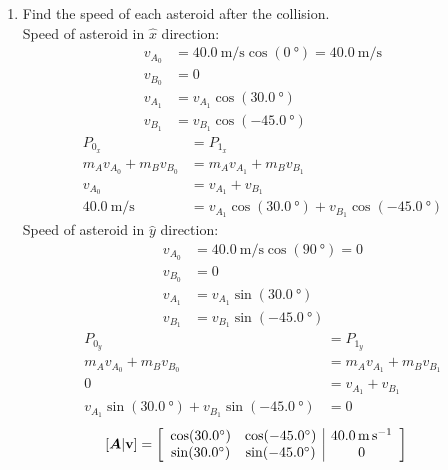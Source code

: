 \documentclass{article}
\begin{document}
\begin{enumerate}[label = \textbf{(\alph*)}]
	\item Find the speed of each asteroid after the collision. \\
		Speed of asteroid in $ \hat{x} $ direction:
		\begin{align*}
			v_{A_0} & = \SI{40.0}{\meter \per \second}\cos(\SI{0}{\degree}) = \SI{40.0}{\meter \per \second} \\
			v_{B_0} & = 0 \\
			v_{A_1} & = v_{A_1}\cos(\SI{30.0}{\degree}) \\
			v_{B_1} & = v_{B_1}\cos(\SI{-45.0}{\degree})
		\end{align*}
		\begin{align*}
			P_{0_x} & = P_{1_x} \\
			m_Av_{A_0} + m_Bv_{B_0} & = m_Av_{A_1} + m_Bv_{B_1} \\
			v_{A_0} & = v_{A_1} + v_{B_1} \\
			\SI{40.0}{\meter \per \second} & = v_{A_1}\cos(\SI{30.0}{\degree}) + v_{B_1}\cos(\SI{-45.0}{\degree})
		\end{align*}
		Speed of asteroid in $ \hat{y} $ direction:
		\begin{align*}
			v_{A_0} & = \SI{40.0}{\meter \per \second}\cos(\SI{90}{\degree}) = 0 \\
			v_{B_0} & = 0 \\
			v_{A_1} & = v_{A_1}\sin(\SI{30.0}{\degree}) \\
			v_{B_1} & = v_{B_1}\sin(\SI{-45.0}{\degree})
		\end{align*}
		\begin{align*}
			P_{0_y} & = P_{1_y} \\
			m_Av_{A_0} + m_Bv_{B_0} & = m_Av_{A_1} + m_Bv_{B_1} \\
			0 & = v_{A_1} + v_{B_1} \\
			v_{A_1}\sin(\SI{30.0}{\degree}) + v_{B_1}\sin(\SI{-45.0}{\degree}) & = 0
		\end{align*}
		\begin{align*}
			\left[ \matr{A} | \vect{v} \right] & =
				\left[ \begin{array}{ c c | c }
					\cos(\SI{30.0}{\degree}) & \cos(\SI{-45.0}{\degree}) & \SI{40.0}{\meter \per \second} \\
					\sin(\SI{30.0}{\degree}) & \sin(\SI{-45.0}{\degree}) & 0
			\end{array} \right]
		\end{align*}
		\begin{align*}

\end{align*}
\end{enumerate}
\end{document}
